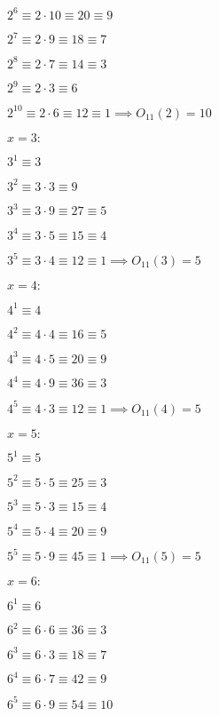 \documentclass[12pt]{amsart}
\begin{document}
$2^6 \equiv 2\cdot 10 \equiv 20 \equiv 9$

$2^7 \equiv 2\cdot 9 \equiv 18 \equiv 7$

$2^8 \equiv 2\cdot 7 \equiv 14 \equiv 3$

$2^9 \equiv 2\cdot 3 \equiv 6$

$2^{10} \equiv 2\cdot 6 \equiv 12 \equiv 1 \implies O_{11}(2) = 10$

\medskip

$x=3:$

\smallskip

$3^1 \equiv 3 $

$3^2 \equiv 3\cdot 3 \equiv 9$

$3^3 \equiv 3\cdot 9 \equiv 27 \equiv 5$

$3^4 \equiv 3\cdot 5 \equiv 15 \equiv 4$

$3^5 \equiv 3\cdot 4 \equiv 12 \equiv 1 \implies O_{11}(3) = 5$

\medskip

$x=4:$

\smallskip

$4^1 \equiv 4$

$4^2 \equiv 4\cdot 4 \equiv 16 \equiv 5$

$4^3 \equiv 4\cdot 5 \equiv 20 \equiv 9$

$4^4 \equiv 4\cdot 9 \equiv 36 \equiv 3$

$4^5 \equiv 4\cdot 3 \equiv 12 \equiv 1 \implies O_{11}(4)=5$

\medskip

$x=5:$

\smallskip

$5^1 \equiv 5$

$5^2 \equiv 5\cdot 5 \equiv 25 \equiv 3$

$5^3 \equiv 5\cdot 3 \equiv 15 \equiv 4$

$5^4 \equiv 5\cdot 4 \equiv 20 \equiv 9$

$5^5 \equiv 5\cdot 9 \equiv 45 \equiv 1 \implies O_{11}(5) = 5$

\medskip

$x=6:$

\smallskip

$6^1 \equiv 6$

$6^2 \equiv 6\cdot 6 \equiv 36 \equiv 3$

$6^3 \equiv 6\cdot 3 \equiv 18 \equiv 7$

$6^4 \equiv 6\cdot 7 \equiv 42 \equiv 9$

$6^5 \equiv 6\cdot 9 \equiv 54 \equiv 10$
\end{document}
